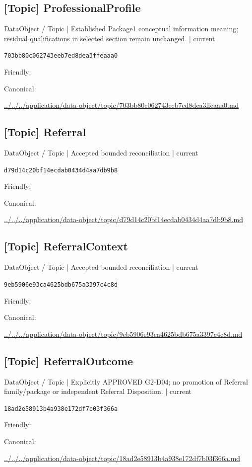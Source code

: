 \documentclass[10pt,a4paper]{article}
\begin{document}
\subsection*{[Topic] ProfessionalProfile}
{\small DataObject / Topic | Established Package1 conceptual information meaning; residual qualifications in selected section remain unchanged. | current}\par
\texttt{703bb80c062743eeb7ed8dea3ffeaaa0}\par
Friendly: \par
Canonical: \par
{\footnotesize\url{../../../application/data-object/topic/703bb80c062743eeb7ed8dea3ffeaaa0.md}}\par
\subsection*{[Topic] Referral}
{\small DataObject / Topic | Accepted bounded reconciliation | current}\par
\texttt{d79d14c20bf14ecdab0434d4aa7db9b8}\par
Friendly: \par
Canonical: \par
{\footnotesize\url{../../../application/data-object/topic/d79d14c20bf14ecdab0434d4aa7db9b8.md}}\par
\subsection*{[Topic] ReferralContext}
{\small DataObject / Topic | Accepted bounded reconciliation | current}\par
\texttt{9eb5906e93ca4625bdb675a3397c4c8d}\par
Friendly: \par
Canonical: \par
{\footnotesize\url{../../../application/data-object/topic/9eb5906e93ca4625bdb675a3397c4c8d.md}}\par
\subsection*{[Topic] ReferralOutcome}
{\small DataObject / Topic | Explicitly APPROVED G2-D04; no promotion of Referral family/package or independent Referral Disposition. | current}\par
\texttt{18ad2e58913b4a938e172df7b03f366a}\par
Friendly: \par
Canonical: \par
{\footnotesize\url{../../../application/data-object/topic/18ad2e58913b4a938e172df7b03f366a.md}}\par
\end{document}
